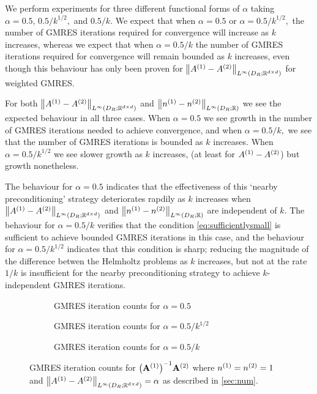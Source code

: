 We perform experiments for three different functional forms of $\alpha$  taking $\alpha = 0.5,\, 0.5/k^{1/2},$ and $ 0.5/k.$ We expect that when $\alpha = 0.5$ or $\alpha = 0.5/k^{1/2},$ the number of GMRES iterations required for convergence will increase as $k$ increases, whereas we expect that when $\alpha = 0.5/k$ the number of GMRES iterations required for convergence will remain bounded as $k$ increases, even though this behaviour has only been proven for $\NLiDRRRdtd{\Aso-\Ast}$ for weighted GMRES.


  For both $\NLiDRRRdtd{\Aso-\Ast}$ and $\NLiDRRR{\nso-\nst}$ we see the expected behaviour in all three cases. When $\alpha = 0.5$ we see growth in the number of GMRES iterations needed to achieve convergence, and when $\alpha = 0.5/k,$ we see that the number of GMRES iterations is bounded as $k$ increases. When $\alpha = 0.5/k^{1/2}$ we see slower growth as $k$ increases, (at least for ${A}^{(1)}-{A}^{(2)}$) but growth nonetheless.

  The behaviour for $\alpha = 0.5$ indicates that the effectiveness of this `nearby preconditioning' strategy deteriorates rapdily as $k$ increases when $\NLiDRRRdtd{\Aso-\Ast}$ and $\NLiDRRR{\nso-\nst}$ are independent of $k$. The behaviour for $\alpha = 0.5/k$ verifies that the condition \cref{eq:sufficientlysmall} is sufficient to achieve bounded GMRES iterations in this case, and the behaviour for $\alpha = 0.5/k^{1/2}$ indicates that this condition is sharp; reducing the magnitude of the difference betwen the Helmholtz problems as $k$ increases, but not at the rate $1/k$ is insufficient for the nearby preconditioning strategy to achieve $k$-independent GMRES iterations.
  \begin{figure}
    \centering
    \begin{subfigure}{\textwidth}
      \centering

\caption{GMRES iteration counts for $\alpha = 0.5$}\label{fig:linfinityA0}
    \end{subfigure}
    
    \begin{subfigure}{\textwidth}
      \centering

  \caption{GMRES iteration counts for $\alpha = 0.5/k^{1/2}$}\label{fig:linfinityA1}
\end{subfigure}

    \begin{subfigure}{\textwidth}
      \centering

  \caption{GMRES iteration counts for $\alpha = 0.5/k$}\label{fig:linfinityA2}
\end{subfigure}
\caption{GMRES iteration counts for $\AmatoI\Amatt$ where ${n}^{(1)}={n}^{(2)}=1$ and $\NLiDRRRdtd{\Aso-\Ast} = \alpha$ as described in \cref{sec:num}.}
\end{figure}

